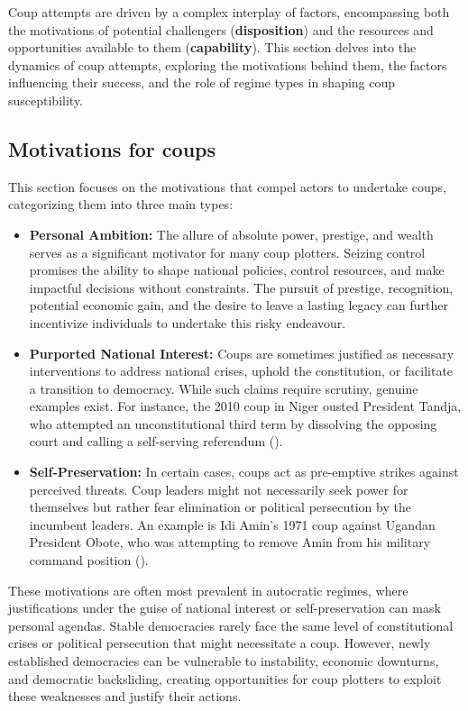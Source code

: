 \documentclass[
  12pt,
]{report}
\begin{document}
Coup attempts are driven by a complex interplay of factors, encompassing
both the motivations of potential challengers (\textbf{disposition}) and
the resources and opportunities available to them (\textbf{capability}).
This section delves into the dynamics of coup attempts, exploring the
motivations behind them, the factors influencing their success, and the
role of regime types in shaping coup susceptibility.

\subsection{Motivations for coups}\label{motivations-for-coups}

This section focuses on the motivations that compel actors to undertake
coups, categorizing them into three main types:

\begin{itemize}
\item
  \textbf{Personal Ambition:} The allure of absolute power, prestige,
  and wealth serves as a significant motivator for many coup plotters.
  Seizing control promises the ability to shape national policies,
  control resources, and make impactful decisions without constraints.
  The pursuit of prestige, recognition, potential economic gain, and the
  desire to leave a lasting legacy can further incentivize individuals
  to undertake this risky endeavour.
\item
  \textbf{Purported National Interest:} Coups are sometimes justified as
  necessary interventions to address national crises, uphold the
  constitution, or facilitate a transition to democracy. While such
  claims require scrutiny, genuine examples exist. For instance, the
  2010 coup in Niger ousted President Tandja, who attempted an
  unconstitutional third term by dissolving the opposing court and
  calling a self-serving referendum
  ().
\item
  \textbf{Self-Preservation:} In certain cases, coups act as pre-emptive
  strikes against perceived threats. Coup leaders might not necessarily
  seek power for themselves but rather fear elimination or political
  persecution by the incumbent leaders. An example is Idi Amin's 1971
  coup against Ugandan President Obote, who was attempting to remove
  Amin from his military command position
  ().
\end{itemize}

These motivations are often most prevalent in autocratic regimes, where
justifications under the guise of national interest or self-preservation
can mask personal agendas. Stable democracies rarely face the same level
of constitutional crises or political persecution that might necessitate
a coup. However, newly established democracies can be vulnerable to
instability, economic downturns, and democratic backsliding, creating
opportunities for coup plotters to exploit these weaknesses and justify
their actions.
\end{document}
